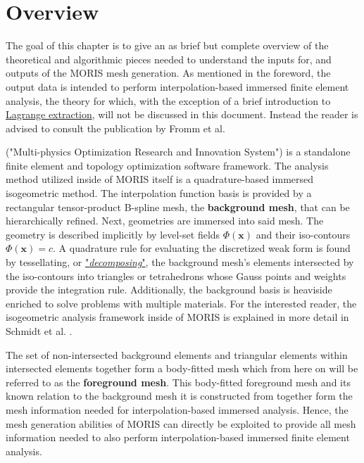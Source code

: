 \chapter{Overview}
\label{sec:overview}

The goal of this chapter is to give an as brief but complete overview of the theoretical and algorithmic pieces needed to understand the inputs for, and outputs of the MORIS mesh generation.
As mentioned in the foreword, the output data is intended to perform interpolation-based immersed finite element analysis, the theory for which, with the exception of a brief introduction to \hyperref[sec:overview_extraction]{Lagrange extraction}, will not be discussed in this document. Instead the reader is advised to consult the publication by Fromm et al. \cite{Fromm2022}

 ("Multi-physics Optimization Research and Innovation System") is a standalone finite element and topology optimization software framework. The analysis method utilized inside of MORIS itself is a quadrature-based immersed isogeometric method. The interpolation function basis is provided by a rectangular tensor-product B-spline mesh, the \textbf{background mesh}, that can be hierarchically refined. Next, geometries are immersed into said mesh. The geometry is described implicitly by level-set fields $\Phi(\bm{x})$ and their iso-contours  $\Phi(\bm{x}) = c$. A quadrature rule for evaluating the discretized weak form is found by tessellating, or \hyperlink{decomposition}{"\emph{decomposing}"}, the background mesh's elements intersected by the iso-contours into triangles or tetrahedrons whose Gauss points and weights provide the integration rule. Additionally, the background basis is heaviside enriched to solve problems with multiple materials. For the interested reader, the isogeometric analysis framework inside of MORIS is explained in more detail in Schmidt et al. \cite{Schmidt2022}.

The set of non-intersected background elements and triangular elements within intersected elements together form a body-fitted mesh which from here on will be referred to as the \textbf{foreground mesh}. This body-fitted foreground mesh and its known relation to the background mesh it is constructed from together form the mesh information needed for interpolation-based immersed analysis. Hence, the mesh generation abilities of MORIS can directly be exploited to provide all mesh information needed to also perform interpolation-based immersed finite element analysis.

